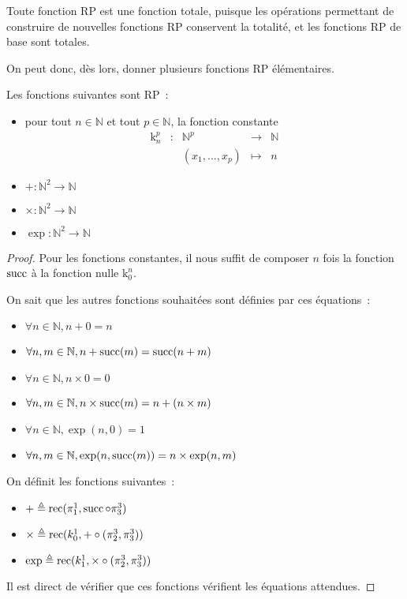 \begin{remark}
  Toute fonction RP est une fonction totale, puisque les opérations permettant
  de construire de nouvelles fonctions RP conservent la totalité, et les
  fonctions RP de base sont totales.
\end{remark}

On peut donc, dès lors, donner plusieurs fonctions RP élémentaires.

\begin{proposition}
  Les fonctions suivantes sont RP~:
  \begin{itemize}
  \item pour tout $n \in \mathbb N$ et tout $p \in \mathbb N$, la fonction
    constante
    \[\begin{array}{ccccc}
    \mathrm k_n^p &:& \mathbb N^p&\longrightarrow &\mathbb N\\
    & & (x_1,\ldots,x_p) &\longmapsto & n
    \end{array}\]
  \item $+ : \mathbb N^2 \to \mathbb N$
  \item $\times : \mathbb N^2 \to \mathbb N$
  \item $\exp : \mathbb N^2 \to \mathbb N$
  \end{itemize}
\end{proposition}

\begin{proof}
  Pour les fonctions constantes, il nous suffit de composer $n$ fois la fonction
  $\operatorname{succ}$ à la fonction nulle $\mathrm k_0^n$.
  
  On sait que les autres fonctions souhaitées sont définies par ces équations~:
  \begin{itemize}
  \item $\forall n \in \mathbb N, n+0 = n$
  \item $\forall n,m \in \mathbb N, n + \operatorname{succ}(m) = \operatorname{succ}(n+m)$
  \item $\forall n \in \mathbb N, n \times 0 = 0$
  \item $\forall n,m \in \mathbb N, n \times \operatorname{succ}(m) = n + (n\times m)$
  \item $\forall n \in \mathbb N, \exp(n,0) = 1$
  \item $\forall n,m\in \mathbb N, \exp(n,\operatorname{succ}(m)) = n \times \exp(n,m)$
  \end{itemize}
  On définit les fonctions suivantes~:
  \begin{itemize}
  \item $+ \triangleq \operatorname{rec}(\pi_1^1,\operatorname{succ}\circ \pi_3^3)$
  \item $\times \triangleq \operatorname{rec}(k_0^1,+ \circ (\pi_2^3,\pi_3^3))$
  \item $\exp \triangleq \operatorname{rec}(k_1^1,\times\circ (\pi_2^3,\pi_3^3))$
  \end{itemize}
  Il est direct de vérifier que ces fonctions vérifient les équations attendues.
\end{proof}

